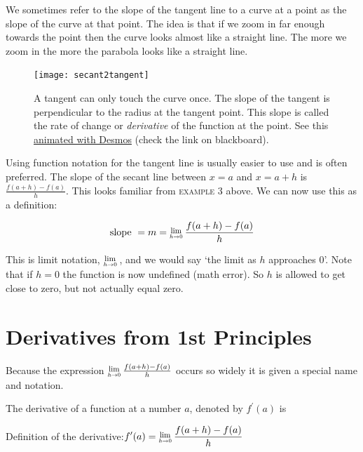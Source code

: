 We sometimes refer to the slope of the tangent line to a curve at a point as the slope of the curve at that point. The idea is that if we zoom in far enough towards the point then the curve looks almost like a straight line. The more we zoom in the more the parabola looks like a straight line.

\begin{figure}\begin{center}
		\texttt{[image: secant2tangent]}
		\caption{A tangent can only touch the curve once. The slope of the tangent is perpendicular to the radius at the tangent point. This slope is called the rate of change or \textit{derivative} of the function at the point. See this \href{https://www.desmos.com/calculator/ialy1tknoo}{animated with Desmos} (check the link on blackboard).}\end{center}
\end{figure}

Using function notation for the tangent line is usually easier to use and is often preferred. The slope of the secant line between $x =a$ and $x =a +h$ is $\displaystyle \frac{f (a +h) -f (a)}{h}$. This looks familiar from \textsc{example} 3 above. We can now use this as a definition:

\begin{tcolorbox}
$$\text{slope }=m=\Lim{h\to 0} \frac{f(a+h)-f(a)}{h}$$
\end{tcolorbox}
This is limit notation, $\Lim{h\to 0} $, and we would say `the limit as $h$ approaches $0$'. Note that if $h=0$ the function is now undefined (math error). So $h$ is allowed to get close to zero, but not actually equal zero.



\section{Derivatives from 1st Principles}
Because the expression $\Lim{h \to 0}\frac{f (a +h) -f (a)}{h}$ occurs so widely it is given a special name and notation.

The derivative of a function at a number $a$, denoted by $f^{ \prime } (a)$ is
\begin{tcolorbox}
Definition of the derivative:\qquad$\displaystyle f^{ \prime } (a) =\Lim{h \to 0}\frac{f (a +h) -f (a)}{h}$
\end{tcolorbox}

